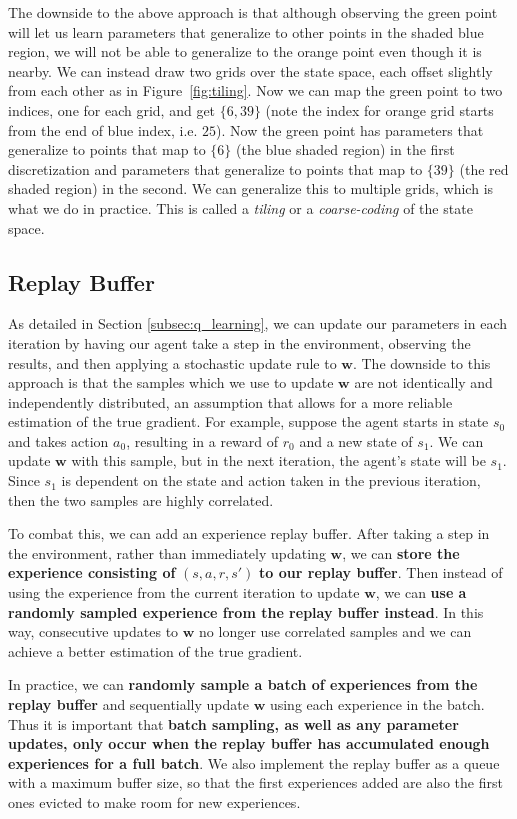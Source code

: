 \documentclass[11pt,addpoints,answers]{exam}
\newcommand{\wv}{\mathbf{w}}
\begin{document}
The downside to the above approach is that although observing the green point will let us learn parameters that generalize to other points in the shaded blue region, we will not be able to generalize to the orange point even though it is nearby. We can instead draw two grids over the state space, each offset slightly from each other as in Figure~\ref{fig:tiling}. Now we can map the green point to two indices, one for each grid, and get $\{6, 39\}$ (note the index for orange grid starts from the end of blue index, i.e. $25$). Now the green point has parameters that generalize to points that map to $\{6\}$ (the blue shaded region) in the first discretization and parameters that generalize to points that map to $\{39\}$ (the red shaded region) in the second. We can generalize this to multiple grids, which is what we do in practice. This is called a \emph{tiling} or a \emph{coarse-coding} of the state space. 

\subsection{Replay Buffer}
As detailed in Section \ref{subsec:q_learning}, we can update our parameters in each iteration by having our agent take a step in the environment, observing the results, and then applying a stochastic update rule to $\wv$. The downside to this approach is that the samples which we use to update $\wv$ are not identically and independently distributed, an assumption that allows for a more reliable estimation of the true gradient. For example, suppose the agent starts in state $s_0$ and takes action $a_0$, resulting in a reward of $r_0$ and a new state of $s_1$. We can update $\wv$ with this sample, but in the next iteration, the agent's state will be $s_1$. Since $s_1$ is dependent on the state and action taken in the previous iteration, then the two samples are highly correlated.

To combat this, we can add an experience replay buffer. After taking a step in the environment, rather than immediately updating $\wv$, we can \textbf{store the experience consisting of} $(s, a, r, s')$ \textbf{to our replay buffer}. Then instead of using the experience from the current iteration to update $\wv$, we can \textbf{use a randomly sampled experience from the replay buffer instead}. In this way, consecutive updates to $\wv$ no longer use correlated samples and we can achieve a better estimation of the true gradient.

In practice, we can \textbf{randomly sample a batch of experiences from the replay buffer} and sequentially update $\wv$ using each experience in the batch. Thus it is important that \textbf{batch sampling, as well as any parameter updates, only occur when the replay buffer has accumulated enough experiences for a full batch}. We also implement the replay buffer as a queue with a maximum buffer size, so that the first experiences added are also the first ones evicted to make room for new experiences. 
\end{document}
